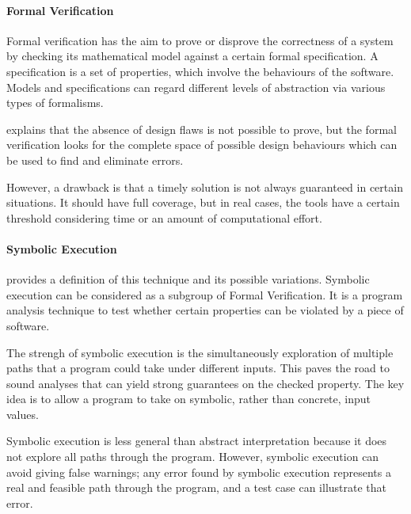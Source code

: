 \paragraph{Formal Verification} Formal verification has the aim to prove or disprove the correctness of a system by checking its mathematical model
against a certain formal specification. A specification is a set of properties, which involve the
behaviours of the software. Models and specifications can regard different levels of abstraction via various types of formalisms.

\cite{FormalVerificationDef} explains that the absence of design flaws is not possible to prove, but the formal verification looks 
for the complete space of possible design behaviours which can be used to find and eliminate errors.

However, a drawback is that a timely solution is not always guaranteed in certain situations. It should have full coverage, but 
in real cases, the tools have a certain threshold considering time or an amount of computational effort.


\paragraph{Symbolic Execution} \citet{SymbolicExecution} provides a definition of this technique and its possible variations. 
Symbolic execution can be considered as a subgroup of Formal Verification. 
It is a program analysis technique to test
whether certain properties can be violated by a piece of software. 

The strengh of symbolic execution is the simultaneously exploration of multiple paths
that a program could take under different inputs. This paves the road to sound analyses that can yield strong guarantees on the checked property. 
The key idea is to allow a program to take on
symbolic, rather than concrete, input values. 

Symbolic execution is less general than abstract interpretation because it does not explore all paths through the program. 
However, symbolic execution can avoid giving false warnings; any error found by symbolic execution represents a real and feasible path through the program, 
and a test case can illustrate that error.




